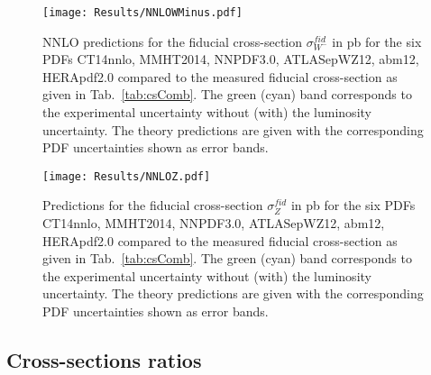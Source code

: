 \begin{figure}[!tbp]
\begin{center}
\texttt{[image: Results/NNLOWMinus.pdf]}
\end{center}
\caption{NNLO predictions for the fiducial cross-section $\sigma^{fid}_{W^{-}}$ in pb for the six PDFs CT14nnlo, MMHT2014, NNPDF3.0, ATLASepWZ12, abm12, HERApdf2.0 compared to the measured fiducial cross-section as given in Tab.~\ref{tab:csComb}. The green (cyan) band corresponds to the experimental uncertainty without (with) the luminosity uncertainty. The theory predictions are given with the corresponding PDF uncertainties shown as error bands.}
\label{fig:NNLODifPDFWm}
\end{figure}

\begin{figure}[!tbp]
\begin{center}
\texttt{[image: Results/NNLOZ.pdf]}
\end{center}
\caption{Predictions for the fiducial cross-section $\sigma^{fid}_Z$ in pb for the six PDFs CT14nnlo, MMHT2014, NNPDF3.0, ATLASepWZ12, abm12, HERApdf2.0 compared to the measured fiducial cross-section as given in Tab.~\ref{tab:csComb}. The green (cyan) band corresponds to the experimental uncertainty without (with) the luminosity uncertainty. The theory predictions are given with the corresponding PDF uncertainties shown as error bands.}
\label{fig:NNLODifPDFZ}
\end{figure}



\subsection{Cross-sections ratios}

